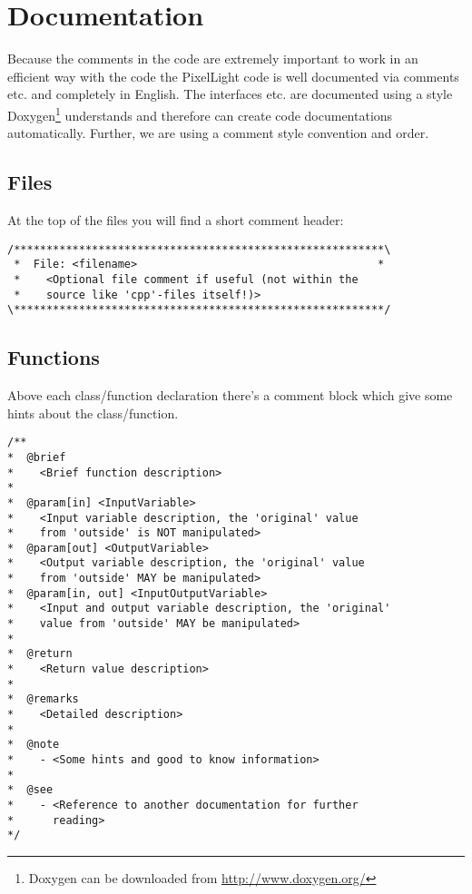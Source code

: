 \chapter{Documentation}
Because the comments in the code are extremely important to work in an efficient way with the code the PixelLight code is well documented via comments etc. and completely in English. The interfaces etc. are documented using a style Doxygen\footnote{Doxygen can be downloaded from \url{http://www.doxygen.org/}} understands and therefore can create code documentations automatically. Further, we are using a comment style convention and order.




\section{Files}
At the top of the files you will find a short comment header:

\begin{lstlisting}[caption=Header comment]
/*********************************************************\
 *  File: <filename>                                     *
 *    <Optional file comment if useful (not within the
 *    source like 'cpp'-files itself!)>
\*********************************************************/
\end{lstlisting}




\section{Functions}
Above each class/function declaration there's a comment block which give some hints about the class/function.

\begin{lstlisting}[caption=Class/function comment block]
/**
*  @brief
*    <Brief function description>
*
*  @param[in] <InputVariable>
*    <Input variable description, the 'original' value
*    from 'outside' is NOT manipulated>
*  @param[out] <OutputVariable>
*    <Output variable description, the 'original' value
*    from 'outside' MAY be manipulated>
*  @param[in, out] <InputOutputVariable>
*    <Input and output variable description, the 'original'
*    value from 'outside' MAY be manipulated>
*
*  @return
*    <Return value description>
*
*  @remarks
*    <Detailed description>
*
*  @note
*    - <Some hints and good to know information>
*
*  @see
*    - <Reference to another documentation for further
*      reading>
*/
\end{lstlisting}

